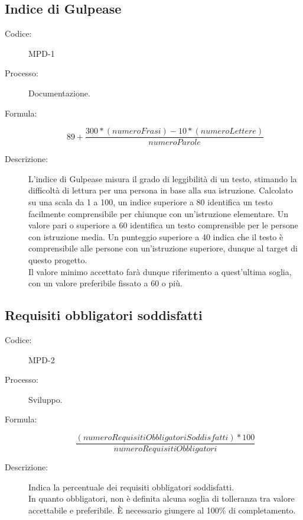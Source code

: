 \subsection{Indice di Gulpease}
\begin{description}
    \item[Codice:] MPD-1
    \item[Processo:] Documentazione.
    \item[Formula:] 
    \begin{equation}
    89 +
    \frac{300 * (numeroFrasi) - 10 * (numeroLettere)}{numeroParole}
    \label{MPD-1}
    \end{equation}
    \item[Descrizione:] L'indice di Gulpease misura il grado di leggibilità di un testo, stimando la difficoltà di lettura per una persona in base alla sua istruzione. Calcolato su una scala da 1 a 100, un indice superiore a 80 identifica un testo facilmente comprensibile per chiunque con un'istruzione elementare. Un valore pari o superiore a 60 identifica un testo comprensible per le persone con istruzione media. Un punteggio superiore a 40 indica che il testo è comprensibile alle persone con un'istruzione superiore, dunque al target di questo progetto.\\Il valore minimo accettato farà dunque riferimento a quest'ultima soglia, con un valore preferibile fissato a 60 o più.
\end{description}

\subsection{Requisiti obbligatori soddisfatti}
\begin{description}
    \item[Codice:] MPD-2
    \item[Processo:] Sviluppo.
    \item[Formula:]
    \begin{equation}
        \frac{(numeroRequisitiObbligatoriSoddisfatti) * 100}{numeroRequisitiObbligatori}
    \end{equation}
    \item[Descrizione:] Indica la percentuale dei requisiti obbligatori soddisfatti.\\ In quanto obbligatori, non è definita alcuna soglia di tolleranza tra valore accettabile e preferibile. È necessario giungere al 100\% di completamento.
\end{description}

